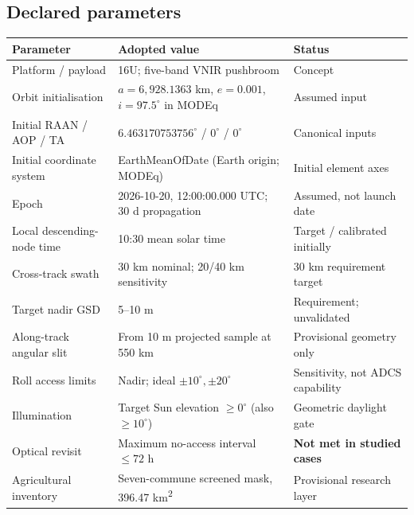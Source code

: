 \documentclass[10pt,a4paper]{article}
\begin{document}
\subsection{Declared parameters}
{\fontsize{9}{12}\selectfont\par{}\begin{minipage}{\linewidth}\captionsetup{hypcap=false}\label{tab:inputs}\end{minipage}\par\nobreak
\begin{tabularx}{\linewidth}{@{}lXl@{}}\toprule\rowcolor{headerbg}Parameter & Adopted value & Status\\\midrule
Platform / payload & 16U; five-band VNIR pushbroom & Concept\\
\rowcolor{rowalt}Orbit initialisation & \(a=6{,}928.1363\) km, \(e=0.001\), \(i=97.5^\circ\) in MODEq & Assumed input\\
Initial RAAN / AOP / TA & \(6.463170753756^\circ\) / \(0^\circ\) / \(0^\circ\) & Canonical inputs\\
Initial coordinate system & EarthMeanOfDate (Earth origin; MODEq) & Initial element axes\\
Epoch & 2026-10-20, 12:00:00.000 UTC; 30 d propagation & Assumed, not launch date\\
\rowcolor{rowalt}Local descending-node time & 10:30 mean solar time & Target / calibrated initially\\
Cross-track swath & 30 km nominal; 20/40 km sensitivity & 30 km requirement target\\
\rowcolor{rowalt}Target nadir GSD & 5--10 m & Requirement; unvalidated\\
\rowcolor{rowalt}Along-track angular slit & From 10 m projected sample at 550 km & Provisional geometry only\\
Roll access limits & Nadir; ideal \(\pm10^\circ,\pm20^\circ\) & Sensitivity, not ADCS capability\\
\rowcolor{rowalt}Illumination & Target Sun elevation \(\ge 0^\circ\) (also \(\ge10^\circ\)) & Geometric daylight gate\\
Optical revisit & Maximum no-access interval \(\le72\) h & \textbf{Not met in studied cases}\\
\rowcolor{rowalt}Agricultural inventory & Seven-commune screened mask, 396.47 km\textsuperscript{2} & Provisional research layer\\\bottomrule\end{tabularx}}
\end{document}
